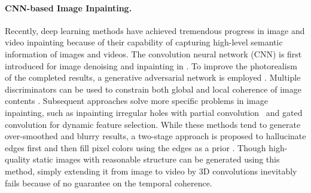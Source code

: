 \paragraph{CNN-based Image Inpainting.}
Recently, deep learning methods have achieved tremendous progress in image and video inpainting because of their capability of capturing high-level semantic information of images and videos. 
%
The convolution neural network (CNN) is first introduced for image denoising and inpainting in \cite{xie2012image}. 
To improve the photorealism of the completed results, a generative adversarial network is employed \cite{pathak2016context}.
Multiple discriminators can be used to constrain both global and local coherence of image contents \cite{iizuka2017globally}. 
Subsequent approaches solve more specific problems in image inpainting, such as inpainting irregular holes with partial convolution~\cite{liu2018partialinpainting} and gated convolution \cite{yu2018free} for dynamic feature selection.
%
While these methods tend to generate over-smoothed and blurry results, a two-stage approach is proposed to hallucinate edges first and then fill pixel colors using the edges as a prior \cite{nazeri2019edgeconnect}. 
Though high-quality static images with reasonable structure can be generated using this method, simply extending it from image to video by 3D convolutions inevitably fails because of no guarantee on the temporal coherence.


